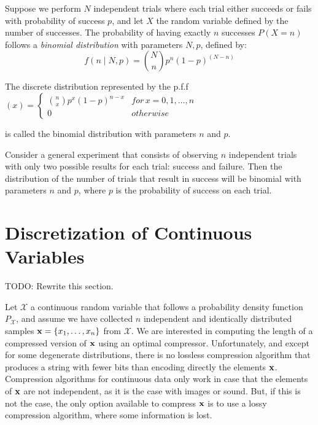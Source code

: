 \begin{example}
Suppose we perform $N$ independent trials where each trial either succeeds or fails with probability of success $p$, and let $X$ the random variable defined by the number of successes. The probability of having exactly $n$ successes $P(X=n)$ follows a \emph{binomial distribution} with parameters $N, p$, defined by:
\[
f(n\mid N, p) = \binom{N}{n} p^n (1-p)^{(N-n)}
\]
\end{example}

\begin{definition}
The discrete distribution represented by the p.f.f $\left(x\right)=\begin{cases}
{n \choose x}p^{x}\left(1-p\right)^{n-x} & for\,x=0,1,\ldots,n\\
0 & otherwise
\end{cases}$
\end{definition}

{\color{red} is called the binomial distribution with parameters $n$ and $p$.}

{\color{red} Consider a general experiment that consists of observing $n$ independent trials with only two possible results for each trial: success and failure. Then the distribution of the number of trials that result in success will be binomial with parameters $n$ and $p$, where $p$ is the probability of success on each trial.} 

%
%

\section{Discretization of Continuous Variables}
\label{sec:discretization_algorithms}

{\color{red} TODO: Rewrite this section.}

Let $\mathcal{X}$ a continuous random variable that follows a probability density function $P_\mathcal{X}$, and assume we have collected $n$ independent and identically distributed samples $\bold{x} = \{x_1, \ldots, x_n\}$ from $\mathcal{X}$. We are interested in computing the length of a compressed version of $\bold{x}$ using an optimal compressor. Unfortunately, and except for some degenerate distributions, there is no lossless compression algorithm that produces a string with fewer bits than encoding directly the elements $\bold{x}$. Compression algorithms for continuous data only work in case that the elements of $\bold{x}$ are not independent, as it is the case with images or sound. But, if this is not the case, the only option available to compress $\bold{x}$ is to use a lossy compression algorithm, where some information is lost.

